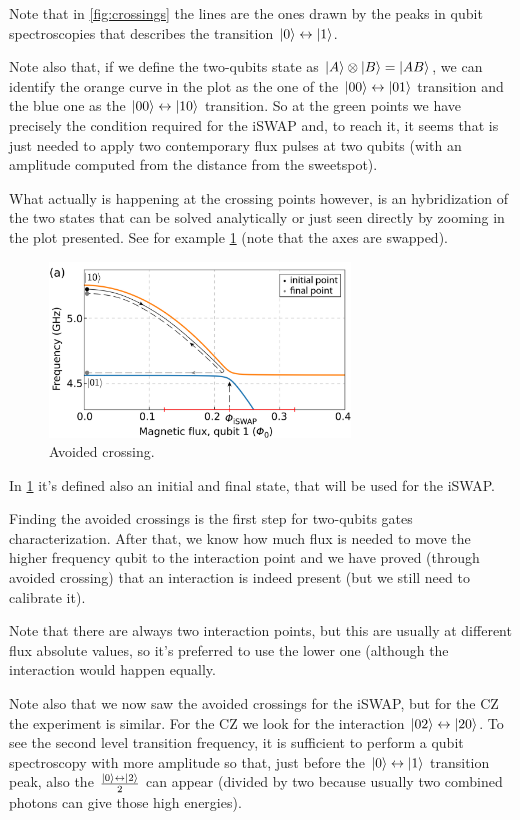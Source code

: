 Note that in \cref{fig:crossings} the lines are the ones drawn by the peaks in qubit spectroscopies that describes the transition $\ket 0 \leftrightarrow \ket 1$.

Note also that, if we define the two-qubits state as $\ket A \otimes \ket B = \ket{AB}$, we can identify the orange curve in the plot as the one of the $\ket{00} \leftrightarrow \ket{01}$ transition and the blue one as the $\ket{00} \leftrightarrow \ket{10}$ transition.
So at the green points we have precisely the condition required for the iSWAP and, to reach it, it seems that is just needed to apply two contemporary flux pulses at two qubits (with an amplitude computed from the distance from the sweetspot).

What actually is happening at the crossing points however, is an hybridization of the two states that can be solved analytically or just seen directly by zooming in the plot presented. 
See for example \cref{fig:avoided_crossing} (note that the axes are swapped).
\begin{figure}[ht]
    \centering
    \includegraphics[width=8cm]{Two-qubits calibration/Figures/avoided_crossing.png}
    \caption{Avoided crossing.}
    \label{fig:avoided_crossing}
\end{figure}

In \cref{fig:avoided_crossing} it's defined also an initial and final state, that will be used for the iSWAP.

Finding the avoided crossings is the first step for two-qubits gates characterization.
After that, we know how much flux is needed to move the higher frequency qubit to the interaction point and we have proved (through avoided crossing) that an interaction is indeed present (but we still need to calibrate it).

Note that there are always two interaction points, but this are usually at different flux absolute values, so it's preferred to use the lower one (although the interaction would happen equally.

Note also that we now saw the avoided crossings for the iSWAP, but for the CZ the experiment is similar.
For the CZ we look for the interaction $\ket{02} \leftrightarrow \ket {20}$.
To see the second level transition frequency, it is sufficient to perform a qubit spectroscopy with more amplitude so that, just before the $\ket 0 \leftrightarrow \ket 1$ transition peak, also the $\frac{\ket 0 \leftrightarrow \ket 2}{2}$ can appear (divided by two because usually two combined photons can give those high energies).


